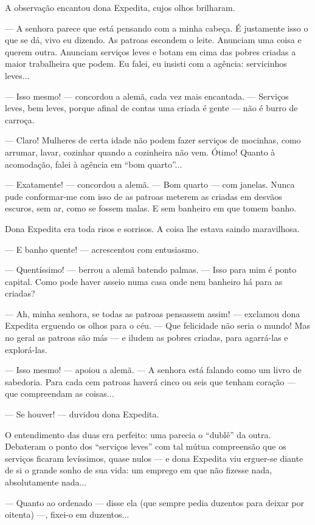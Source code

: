A observação encantou dona Expedita, cujos olhos brilharam.

--- A senhora parece que está pensando com a minha cabeça. É justamente
isso o que se dá, vivo eu dizendo. As patroas escondem o leite. Anunciam
uma coisa e querem outra. Anunciam serviços leves e botam em cima das
pobres criadas a maior trabalheira que podem. Eu falei, eu insisti com a
agência: servicinhos leves...

--- Isso mesmo! --- concordou a alemã, cada vez mais encantada. ---
Serviços leves, bem leves, porque afinal de contas uma criada é gente
--- não é burro de carroça.

--- Claro! Mulheres de certa idade não podem fazer serviços de mocinhas,
como arrumar, lavar, cozinhar quando a cozinheira não vem. Ótimo! Quanto
à acomodação, falei à agência em ``bom quarto''...

--- Exatamente! --- concordou a alemã. --- Bom quarto --- com janelas.
Nunca pude conformar-me com isso de as patroas meterem as criadas em
desvãos escuros, sem ar, como se fossem malas. E sem banheiro em que
tomem banho.

Dona Expedita era toda risos e sorrisos. A coisa lhe estava saindo
maravilhosa.

--- E banho quente! --- acrescentou com entusiasmo.

--- Quentíssimo! --- berrou a alemã batendo palmas. --- Isso para mim é
ponto capital. Como pode haver asseio numa casa onde nem banheiro há
para as criadas?

--- Ah, minha senhora, se todas as patroas pensassem assim! --- exclamou
dona Expedita erguendo os olhos para o céu. --- Que felicidade não seria
o mundo! Mas no geral as patroas são más --- e iludem as pobres criadas,
para agarrá-las e explorá-las.

--- Isso mesmo! --- apoiou a alemã. --- A senhora está falando como um
livro de sabedoria. Para cada cem patroas haverá cinco ou seis que
tenham coração --- que compreendam as coisas...

--- Se houver! --- duvidou dona Expedita.

O entendimento das duas era perfeito: uma parecia o ``dublê'' da outra.
Debateram o ponto dos ``serviços leves'' com tal mútua compreensão que
os serviços ficaram levíssimos, quase nulos --- e dona Expedita viu
erguer-se diante de si o grande sonho de sua vida: um emprego em que não
fizesse nada, absolutamente nada...

--- Quanto ao ordenado --- disse ela (que sempre pedia duzentos para
deixar por oitenta) ---, fixei-o em duzentos...

